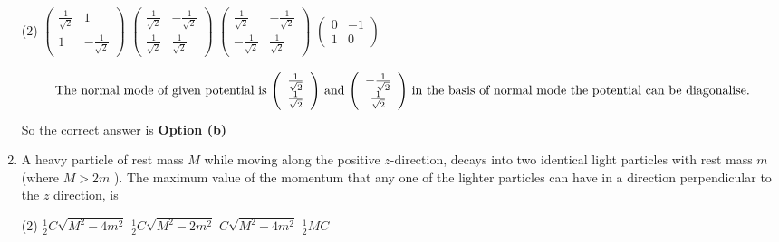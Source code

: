 \begin{enumerate}
 \begin{tasks}(2)
	\task[\textbf{a.}]$\left(\begin{array}{cc}\frac{1}{\sqrt{2}} & 1 \\ 1 & -\frac{1}{\sqrt{2}}\end{array}\right)$
	\task[\textbf{b.}]$\left(\begin{array}{cc}\frac{1}{\sqrt{2}} & -\frac{1}{\sqrt{2}} \\ \frac{1}{\sqrt{2}} & \frac{1}{\sqrt{2}}\end{array}\right)$
	\task[\textbf{c.}]$\left(\begin{array}{cc}\frac{1}{\sqrt{2}} & -\frac{1}{\sqrt{2}} \\ -\frac{1}{\sqrt{2}} & \frac{1}{\sqrt{2}}\end{array}\right)$
	\task[\textbf{d.}] $\left(\begin{array}{cc}0 & -1 \\ 1 & 0\end{array}\right)$
\end{tasks}
\begin{answer}
	\begin{align*}
\intertext{ The normal mode of given potential is $\left(\begin{array}{c}\frac{1}{\sqrt{2}} \\ \frac{1}{\sqrt{2}}\end{array}\right)$ and $\left(\begin{array}{c}-\frac{1}{\sqrt{2}} \\ \frac{1}{\sqrt{2}}\end{array}\right)$ in the basis of normal mode the potential can be diagonalise.}
	\end{align*}
	So the correct answer is \textbf{Option (b)}
\end{answer}
\item  A heavy particle of rest mass $M$ while moving along the positive $z$-direction, decays into two identical light particles with rest mass $m$ (where $M>2 m$ ). The maximum value of the momentum that any one of the lighter particles can have in a direction perpendicular to the $z$ direction, is
 \begin{tasks}(2)
	\task[\textbf{a.}] $\frac{1}{2} C \sqrt{M^{2}-4 m^{2}}$
	\task[\textbf{b.}]$\frac{1}{2} C \sqrt{M^{2}-2 m^{2}}$
	\task[\textbf{c.}] $C \sqrt{M^{2}-4 m^{2}}$
	\task[\textbf{d.}]$\frac{1}{2} M C$ 
\end{tasks}
\begin{answer}$\left. \right. $
		\begin{figure}[H]

\end{figure}
\end{answer}
\end{enumerate}

